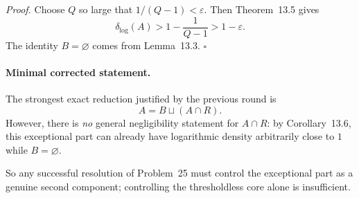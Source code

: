 \emph{Proof.}
Choose \(Q\) so large that \(1/(Q-1)<\varepsilon\).  Then Theorem~13.5 gives
\[
\delta_{\log}(A)>1-\frac1{Q-1}>1-\varepsilon.
\]
The identity \(B=\varnothing\) comes from Lemma~13.3. \hfill \(\square\)

\paragraph{Minimal corrected statement.}
The strongest exact reduction justified by the previous round is
\[
A=B\sqcup (A\cap R).
\]
However, there is \emph{no} general negligibility statement for \(A\cap R\): by Corollary~13.6, this exceptional part can already have logarithmic density arbitrarily close to \(1\) while \(B=\varnothing\).

So any successful resolution of Problem~25 must control the exceptional part as a genuine second component; controlling the thresholdless core alone is insufficient.


